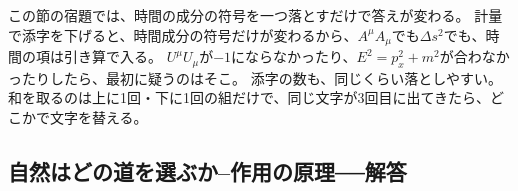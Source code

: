 \documentclass[paper=b5j,fontsize=11Q,jafontsize=11Q,baselineskip=19Q]{jlreq}
\newcommand{\runningtitle}{章題未定}
\numberwithin{equation}{section}
\begin{document}
この節の宿題では、時間の成分の符号を一つ落とすだけで答えが変わる。
計量で添字を下げると、時間成分の符号だけが変わるから、$A^\mu A_\mu$でも$\Delta s^2$でも、時間の項は引き算で入る。
$U^\mu U_\mu$が$-1$にならなかったり、$E^2=p_x^2+m^2$が合わなかったりしたら、最初に疑うのはそこ。
添字の数も、同じくらい落としやすい。和を取るのは上に1回・下に1回の組だけで、同じ文字が3回目に出てきたら、どこかで文字を替える。


\par\bigskip
\endgroup
\begingroup
\renewcommand{\runningtitle}{解答 第2章　微積分・テンソル・作用}
\newcommand{\pder}[2]{\frac{\partial #1}{\partial #2}}
\newcommand{\vct}[1]{\boldsymbol{#1}}
\renewcommand{\runningtitle}{解答 第2章　微積分・テンソル・作用}
\subsection[自然はどの道を選ぶか]{自然はどの道を選ぶか--作用の原理──解答}
\end{document}
